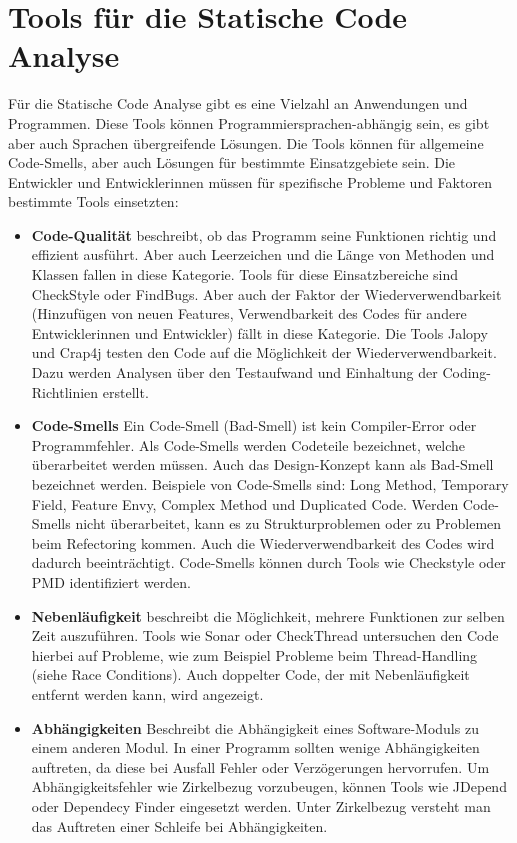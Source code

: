 \section{Tools für die Statische Code Analyse}
Für die Statische Code Analyse gibt es eine Vielzahl an Anwendungen und Programmen. Diese Tools können Programmiersprachen-abhängig sein, es gibt aber auch Sprachen übergreifende Lösungen. Die Tools können für allgemeine Code-Smells, aber auch Lösungen für bestimmte Einsatzgebiete sein. Die Entwickler und Entwicklerinnen müssen für  spezifische Probleme und Faktoren bestimmte Tools einsetzten:

\begin{itemize}
\item \textbf{Code-Qualität} beschreibt, ob das Programm seine Funktionen richtig und effizient ausführt. Aber auch Leerzeichen und die Länge von Methoden und Klassen fallen in diese Kategorie. Tools für diese Einsatzbereiche sind CheckStyle oder FindBugs. Aber auch der Faktor der Wiederverwendbarkeit (Hinzufügen von neuen Features, Verwendbarkeit des Codes für andere Entwicklerinnen und Entwickler) fällt in diese Kategorie. Die Tools Jalopy und Crap4j testen den Code auf die Möglichkeit der Wiederverwendbarkeit. Dazu werden Analysen über den Testaufwand und Einhaltung der Coding-Richtlinien erstellt.
\item  \textbf{Code-Smells}
Ein Code-Smell (Bad-Smell) ist kein Compiler-Error oder Programmfehler. Als Code-Smells werden Codeteile bezeichnet, welche überarbeitet werden müssen. Auch das Design-Konzept kann als Bad-Smell bezeichnet werden. Beispiele von Code-Smells sind: Long Method, Temporary Field, Feature Envy, Complex Method und Duplicated Code. Werden Code-Smells nicht überarbeitet, kann es zu Strukturproblemen oder zu Problemen beim Refectoring kommen. Auch die Wiederverwendbarkeit des Codes wird dadurch beeinträchtigt. Code-Smells können durch Tools wie Checkstyle oder PMD identifiziert werden. \cite{palomba2014they}
\item \textbf{Nebenläufigkeit}
beschreibt die Möglichkeit, mehrere Funktionen zur selben Zeit auszuführen. Tools wie Sonar oder CheckThread untersuchen den Code hierbei auf Probleme, wie zum Beispiel Probleme beim Thread-Handling (siehe Race Conditions). Auch doppelter Code, der mit Nebenläufigkeit entfernt werden kann, wird angezeigt.
\item \textbf{Abhängigkeiten}
Beschreibt die Abhängigkeit eines Software-Moduls zu einem anderen Modul. In einer Programm sollten wenige Abhängigkeiten auftreten, da diese bei Ausfall Fehler oder Verzögerungen hervorrufen. Um Abhängigkeitsfehler wie Zirkelbezug vorzubeugen, können Tools wie JDepend oder Dependecy Finder eingesetzt werden. Unter Zirkelbezug versteht man das Auftreten einer Schleife bei Abhängigkeiten.

\end{itemize}
